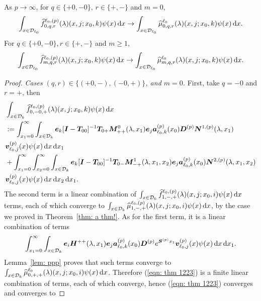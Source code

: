 \begin{thm}\label{thm: a thm2!}
	As \(p\to \infty\), for \(q\in\{+0,-0\},\, r\in\{+,-\}\) and \(m=0\),  
	\begin{align}\int_{x\in\mathcal{D}_{\ell_0}}\widehat f_{0,q,r}^{\ell_0,(p)}(\lambda)(x,j;x_0,k)\psi(x)\, \mathrm{d} x \to \int_{x\in\mathcal{D}_{\ell_0}}\widehat \mu_{0,q,r}^{\ell_0}(\lambda)(x,j;x_0,k)\psi(x)\, \mathrm{d} x.\end{align}
	For \(q\in\{+0,-0\}, r\in\{+,-\}\) and \(m\geq 1\), 
	\begin{align}\int_{x\in\mathcal{D}_{\ell_0}}\widehat f_{m,q,r}^{\ell_0,(p)}(\lambda)(x,j;x_0,k)\psi(x)\, \mathrm{d} x \to \int_{x\in\mathcal{D}_{\ell_0}}\widehat \mu_{m,q,r}^{\ell_0}(\lambda)(x,j;x_0,k)\psi(x)\, \mathrm{d} x.\label{eqn: thm 22}\end{align}
\end{thm}
\begin{proof}
	\textit{Cases \((q,r) \in \{(+0,-),(-0,+)\}\), and \(m=0\).} First, take \(q=-0\) and \(r=+\), then 
	\begin{align}
		&\int_{x\in\mathcal{D}_k}\widehat{f}_{0,-0,+}^{\ell_0,(p)}(\lambda)(x,j;x_0,k)\psi(x)\, \mathrm{d} x \nonumber 
		\\&:=\int_{x_1=0}^\infty \int_{x\in\mathcal{D}_k} \boldsymbol e_k [\boldsymbol I - \boldsymbol T_{00}]^{-1}\boldsymbol T_{0+} \boldsymbol M^0_{++}(\lambda,x_1)\boldsymbol e_j \nonumber
		\boldsymbol a_{\ell_0,k}^{(p)}(x_0) \boldsymbol D^{(p)} \boldsymbol N^{1,(p)}(\lambda,x_1) 
		\\& {\boldsymbol v}_{\ell_0,j}^{(p)}(x)\psi(x)\, \mathrm{d} x\, \mathrm{d} x_{1}  \nonumber
		\\& + \int_{x_1=0}^\infty\int_{x_2=0}^\infty \int_{x\in\mathcal{D}_k}  \boldsymbol e_k [\boldsymbol I - \boldsymbol T_{00}]^{-1}\boldsymbol T_{0-} \boldsymbol M^1_{-+}(\lambda,x_1,x_{2})\boldsymbol e_j \nonumber
		\boldsymbol a_{\ell_0,k}^{(p)}(x_0)\boldsymbol N^{2,(p)}(\lambda,x_1,x_{2}) 
		\\& {\boldsymbol v}_{\ell_0,j}^{(p)}(x)\psi(x)\, \mathrm{d} x\, \mathrm{d} x_{2} \, \mathrm{d} x_1. \label{eqn: thm 1223}
	\end{align}
	The second term is a linear combination of \(\int_{x\in\mathcal{D}_k}\widehat{f}_{1,-,+}^{\ell_0,(p)}(\lambda)(x,j;x_0,i) \psi(x)\, \mathrm{d} x\) terms, each of which converge to \(\int_{x\in\mathcal{D}_k}\widehat{\mu}_{1,-,+}^{\ell_0,(p)}(\lambda)(x,j;x_0,i) \psi(x)\, \mathrm{d} x\), by the case we proved in Theorem~\ref{thm: a thm!}. As for the first term, it is a linear combination of terms
	\[\int_{x_1=0}^\infty \int_{x\in\mathcal{D}_k} \boldsymbol e_i \boldsymbol H^{++}(\lambda,x_1)\boldsymbol e_j \nonumber
	\boldsymbol a_{\ell_0,k}^{(p)}(x_0) \boldsymbol D^{(p)} e^{\boldsymbol S^{(p)}x_1} 
	{\boldsymbol v}_{\ell_0,j}^{(p)}(x)\psi(x)\, \mathrm{d} x\, \mathrm{d} x_{1}.\]
	Lemma~\ref{lem: ppp} proves that such terms converge to \(\int_{x\in\mathcal{D}_k}\widehat{\mu}_{0,+,+}^{\ell_0}(\lambda)(x,j;x_0,i) \psi(x)\, \mathrm{d} x\). Therefore (\ref{eqn: thm 1223}) is a finite linear combination of terms, each of which converge, hence (\ref{eqn: thm 1223}) converges and converges to 

\end{proof}
